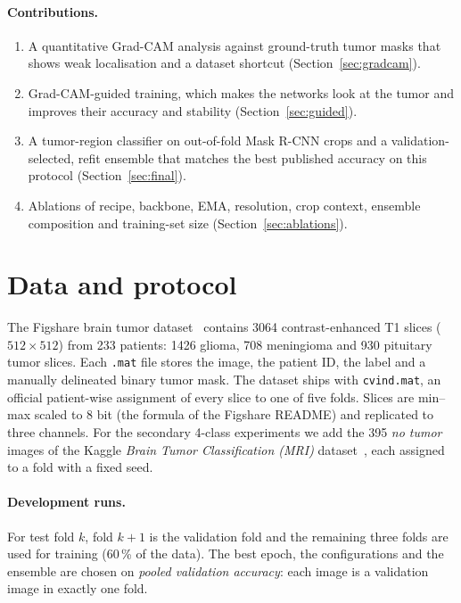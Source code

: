 \documentclass[11pt,a4paper]{article}
\begin{document}
\paragraph{Contributions.}
\begin{enumerate}
  \item A quantitative Grad-CAM analysis against ground-truth tumor masks that shows weak localisation and a dataset
        shortcut (Section~\ref{sec:gradcam}).
  \item Grad-CAM-guided training, which makes the networks look at the tumor and improves their accuracy and stability
        (Section~\ref{sec:guided}).
  \item A tumor-region classifier on out-of-fold Mask R-CNN crops and a validation-selected, refit ensemble that matches
        the best published accuracy on this protocol (Section~\ref{sec:final}).
  \item Ablations of recipe, backbone, EMA, resolution, crop context, ensemble composition and training-set size
        (Section~\ref{sec:ablations}).
\end{enumerate}

\section{Data and protocol}\label{sec:data}

The Figshare brain tumor dataset~\cite{figshare,cheng2015} contains 3064 contrast-enhanced T1 slices ($512\times512$)
from 233 patients: 1426 glioma, 708 meningioma and 930 pituitary tumor slices. Each \texttt{.mat} file stores the image,
the patient ID, the label and a manually delineated binary tumor mask. The dataset ships with \texttt{cvind.mat}, an
official patient-wise assignment of every slice to one of five folds. Slices are min--max scaled to 8 bit (the formula
of the Figshare README) and replicated to three channels. For the secondary 4-class experiments we add the 395
\emph{no tumor} images of the Kaggle \emph{Brain Tumor Classification (MRI)} dataset~\cite{bhuvaji}, each assigned to a
fold with a fixed seed.

\paragraph{Development runs.} For test fold $k$, fold $k{+}1$ is the validation fold and the remaining three folds
are used for training (60\,\% of the data). The best epoch, the configurations and the ensemble are chosen on
\emph{pooled validation accuracy}: each image is a validation image in exactly one fold.
\end{document}

